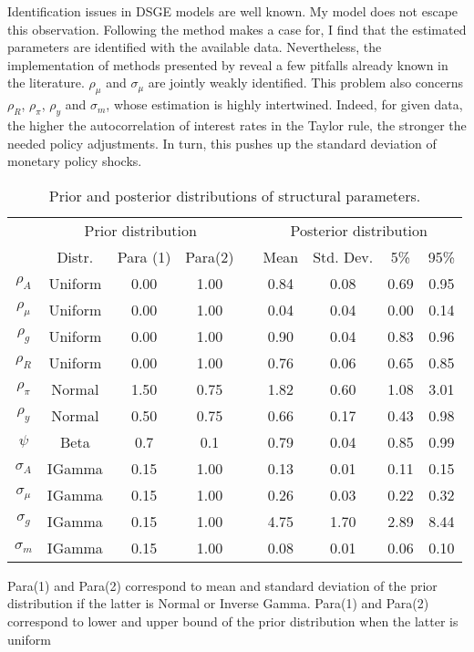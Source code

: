 \documentclass[a4paper]{article}
\begin{document}
Identification issues in DSGE models are well known. My model does not escape this observation. Following the method \citet{ISKREV2010189} makes a case for, I find that the estimated parameters are identified with the available data. Nevertheless, the implementation of methods presented by \citet{iskrev2010evaluating} reveal a few pitfalls already known in the literature. $\rho_\mu$ and $\sigma_{\mu}$ are jointly weakly identified. This problem also concerns $\rho_R$, $\rho_{\pi}$, $\rho_y$ and $\sigma_m$, whose estimation is highly intertwined. Indeed, for given data, the higher the autocorrelation of interest rates in the Taylor rule, the stronger the needed policy adjustments. In turn, this pushes up the standard deviation of monetary policy shocks.

\begin{table}[H]
\centering
\caption{Prior and posterior distributions of structural parameters.}
\begin{tabular}{ccccccccc}
\toprule
\toprule
& \multicolumn{3}{c}{ Prior distribution } &       & \multicolumn{4}{c}{ Posterior distribution } \\
\cmidrule{2-4} \cmidrule{6-9}
& Distr. & Para (1) & Para(2) &       & Mean  & Std. Dev. & 5\%   & 95\% \\
\toprule
$\rho_A$ & Uniform & 0.00  & 1.00  &       & 0.84  & 0.08  & 0.69  & 0.95 \\
$\rho_\mu$ & Uniform & 0.00  & 1.00  &       & 0.04  & 0.04  & 0.00  & 0.14 \\
$\rho_g$ & Uniform & 0.00  & 1.00  &       & 0.90  & 0.04  & 0.83  & 0.96 \\
$\rho_R$ & Uniform & 0.00  & 1.00  &       & 0.76  & 0.06  & 0.65  & 0.85 \\
$\rho_\pi$ & Normal & 1.50  & 0.75  &       & 1.82  & 0.60  & 1.08  & 3.01 \\
$\rho_y$ & Normal & 0.50  & 0.75  &       & 0.66  & 0.17  & 0.43  & 0.98 \\
$\psi$ & Beta & 0.7  & 0.1  &       & 0.79  & 0.04  & 0.85  & 0.99 \\
$\sigma_A$ & IGamma & 0.15  & 1.00  &       & 0.13  & 0.01  & 0.11  & 0.15 \\
$\sigma_\mu$ & IGamma & 0.15  & 1.00  &       & 0.26  & 0.03  & 0.22  & 0.32 \\
$\sigma_g$ & IGamma & 0.15  & 1.00  &       & 4.75  & 1.70  & 2.89  & 8.44 \\
$\sigma_m$ & IGamma & 0.15  & 1.00  &       & 0.08  & 0.01  & 0.06  & 0.10 \\
\bottomrule
\end{tabular}%
\label{estimates}
\begin{flushleft}
\footnotesize{Para(1) and Para(2) correspond to mean and standard deviation of the prior distribution if the latter is Normal or Inverse Gamma. Para(1) and Para(2) correspond to lower and upper bound of the prior distribution when the latter is uniform}
\end{flushleft}
\end{table}%
\end{document}
